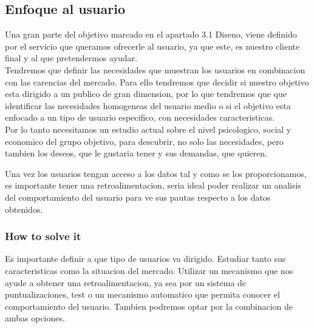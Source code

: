 \subsection{Enfoque al usuario}
Una gran parte del objetivo marcado en el apartado 3.1 Diseno, viene definido por el servicio que queramos ofrecerle
al usuario, ya que este, es nuestro cliente final y al que pretendermos ayudar.\\


Tendremos que definir las necesidades que muestran los usuarios en combinacion con las carencias del mercado.
Para ello tendremos que decidir si nuestro objetivo esta dirigido a un publico de gran dimension, por lo que tendremos que
que identificar las necesidades homogeneas del usuario medio o si el objetivo esta enfocado a un tipo de usuario
especifico, con necesidades caracteristicas.\\

Por lo tanto necesitamos un estudio actual sobre el nivel psicologico, social y economico del grupo objetivo, para descubrir, no solo
las necesidades, pero tambien los deseos, que le gustaria tener y sus demandas, que quieren.

Una vez los usuarios tengan acceso a los datos tal y como se los proporcionamos, es importante tener una retroalimentacion, 
seria ideal poder realizar un analisis del comportamiento del usuario para ve sus pautas respecto a los datos obtenidos.

\subsubsection{How to solve it} 
Es importante definir a que tipo de usuarios va dirigido. Estudiar tanto sus caracteristicas como la situacion del
mercado.
Utilizar un mecanismo que nos ayude a obtener una retroalimentacion, ya sea por un sistema de puntualizaciones, test o
un mecanismo automatico que permita conocer el comportamiento del usuario. Tambien podremos optar por la combinacion de ambas 
opciones.

